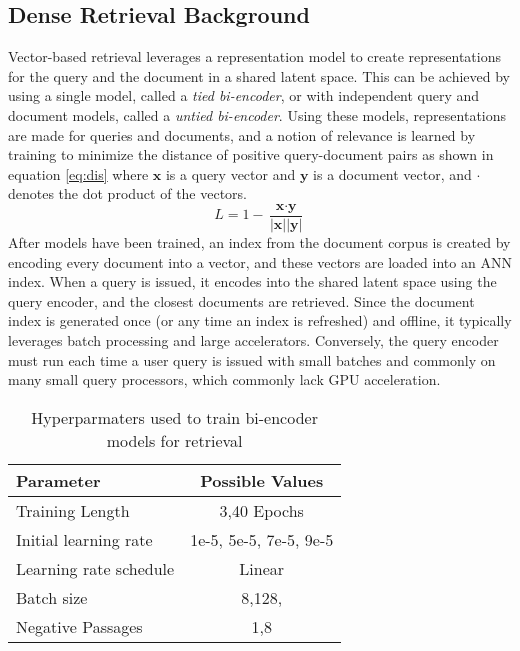 \documentclass[11pt]{article}
\begin{document}
\subsection{Dense Retrieval Background}
Vector-based retrieval leverages a representation model to create representations for the query and the document in a shared latent space. This can be achieved by using a single model, called a \textit{tied bi-encoder}, or with independent query and document models, called a \textit{untied bi-encoder}. Using these models, representations are made for queries and documents, and a notion of relevance is learned by training to minimize the distance of positive query-document pairs as shown in equation \ref{eq:dis} where $\textbf{x}$ is a query vector and $\textbf{y}$ is a document vector, and $\cdot$ denotes the dot product of the vectors.\\
\begin{equation}
L = 1 - \frac{\textbf{x} \cdot \textbf{y}}{|\textbf{x}||\textbf{y}|}
 \label{eq:dis}
\end{equation}
After models have been trained, an index from the document corpus is created by encoding every document into a vector, and these vectors are loaded into an ANN index. When a query is issued, it encodes into the shared latent space using the query encoder, and the closest documents are retrieved. Since the document index is generated once (or any time an index is refreshed) and offline, it typically leverages batch processing and large accelerators. Conversely, the query encoder must run each time a user query is issued with small batches and commonly on many small query processors, which commonly lack GPU acceleration.\\
\begin{table}[htb!]
      \centering
        {\small 
            \begin{tabular}{l|c}
            \toprule
            Parameter & Possible Values \\
            \midrule
            Training Length& 3,40 Epochs \\
            Initial learning rate & 1e-5, 5e-5, 7e-5, 9e-5\\
            Learning rate schedule &  Linear \\
            \midrule
                Batch size & 8,128, \\
            \midrule
                Negative Passages & 1,8 \\
            \midrule
            \bottomrule
            \end{tabular}
        }
    \caption{Hyperparmaters used to train bi-encoder models for retrieval   \label{tab:hyperparams-sparse-transfer-ir}}
\end{table}
\end{document}
